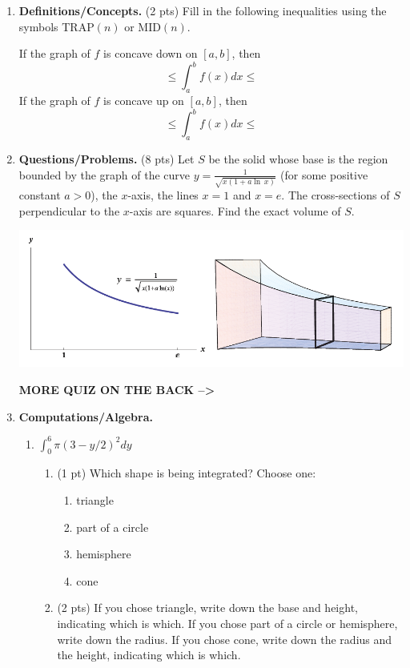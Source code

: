 \documentclass[11pt,letterpaper]{article}
\begin{document}
\begin{enumerate}

\item \textbf{Definitions/Concepts.} (2 pts) Fill in the following inequalities using the symbols TRAP$(n)$ or MID$(n)$.  

\smallskip
If the graph of $f$ is concave down on $[a,b]$, then
\[\leq\int_a^bf(x)dx\leq\]
If the graph of $f$ is concave up on $[a,b]$, then
\[\leq\int_a^bf(x)dx\leq\]

\vspace{1pc}
\item \textbf{Questions/Problems.} (8 pts)
\noindent Let $S$ be the solid whose base is the region bounded by the graph of the curve $y=\frac{1}{\sqrt{x(1+a\ln\,x)}}$ (for some positive constant $a>0$), the $x$-axis, the lines $x=1$ and $x=e$.  The cross-sections of $S$ perpendicular to the $x$-axis are squares.  Find the exact volume of $S$.
\smallskip
\begin{center}
\includegraphics[width=.9\textwidth]{quiz3pic.png}
\end{center}
\vspace{10pc}
\vfill
\hfill{\bf MORE QUIZ ON THE BACK --\textgreater}

\item \textbf{Computations/Algebra.} 

\smallskip
\begin{enumerate} 
\item $\int_0^6\pi(3-y/2)^2dy$
\smallskip
\begin{enumerate}
\item (1 pt) Which shape is being integrated?  Choose one:
\begin{enumerate}
\item triangle
\item part of a circle
\item hemisphere
\item cone
\end{enumerate}
\smallskip
\item (2 pts) If you chose triangle, write down the base and height, indicating which is which.  If you chose part of a circle or hemisphere, write down the radius.  If you chose cone, write down the radius and the height, indicating which is which.


\end{enumerate}
\end{enumerate}
\end{enumerate}
\end{document}
